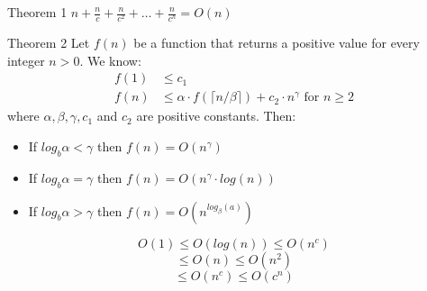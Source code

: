 \documentclass{lecture}
\begin{document}
\begin{landscape}
\begin{multicols}{2}
    \begin{note}{Theorem 1}
        $n+\frac{n}{c}+\frac{n}{c^2}+\ldots+\frac{n}{c^h}=O(n)$
    \end{note}
    \vfill
    \begin{note}{Theorem 2}
        Let $f(n)$ be a function that returns a positive value for every integer $n>0$. We know:
        \begin{align*}
            f(1) & \leqslant c_1\\
            f(n) & \leqslant \alpha \cdot f(\lceil n / \beta \rceil) + c_2 \cdot n^{\gamma} \text{ for } n \geqslant 2
        \end{align*}
        where $\alpha, \beta, \gamma, c_1$ and $c_2$ are positive constants. Then:
        \begin{itemize}[nolistsep]
            \item If $log_{b} \alpha < \gamma$ then $f(n) = O(n^\gamma)$
            \item If $log_{b} \alpha = \gamma$ then $f(n) = O(n^\gamma \cdot log(n))$
            \item If $log_{b} \alpha > \gamma$ then $f(n) = O(n^{log_\beta(a)})$
        \end{itemize}
    \end{note}
    \vfill

    \begin{note}{}
        $$O(1) \leqslant O(log(n)) \leqslant O(n^c)$$ 
        $$\leqslant O(n) \leqslant O(n^2)$$ 
        $$\leqslant O(n^c) \leqslant O(c^n)$$
    \end{note}
    \vfill


\end{multicols}
\end{landscape}
\end{document}
